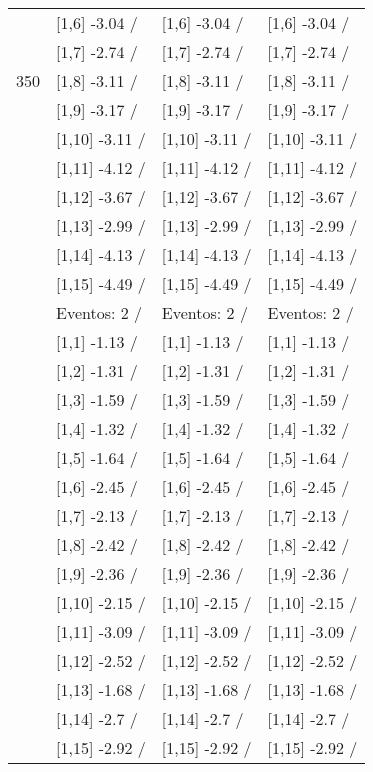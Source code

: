 \begin{table}
\begin{tabular}[t]{llll}
 & {}[1,6] -3.04  / & {}[1,6] -3.04  / & {}[1,6] -3.04  /\\
 & {}[1,7] -2.74  / & {}[1,7] -2.74  / & {}[1,7] -2.74  /\\
350 & {}[1,8] -3.11  / & {}[1,8] -3.11  / & {}[1,8] -3.11  /\\
\addlinespace
 & {}[1,9] -3.17  / & {}[1,9] -3.17  / & {}[1,9] -3.17  /\\
 & {}[1,10] -3.11  / & {}[1,10] -3.11  / & {}[1,10] -3.11  /\\
 & {}[1,11] -4.12  / & {}[1,11] -4.12  / & {}[1,11] -4.12  /\\
 & {}[1,12] -3.67  / & {}[1,12] -3.67  / & {}[1,12] -3.67  /\\
 & {}[1,13] -2.99  / & {}[1,13] -2.99  / & {}[1,13] -2.99  /\\
\addlinespace
 & {}[1,14] -4.13  / & {}[1,14] -4.13  / & {}[1,14] -4.13  /\\
 & {}[1,15] -4.49  / & {}[1,15] -4.49  / & {}[1,15] -4.49  /\\
 & Eventos:  2 / & Eventos:  2 / & Eventos:  2 /\\
 & {}[1,1] -1.13  / & {}[1,1] -1.13  / & {}[1,1] -1.13  /\\
 & {}[1,2] -1.31  / & {}[1,2] -1.31  / & {}[1,2] -1.31  /\\
\addlinespace
 & {}[1,3] -1.59  / & {}[1,3] -1.59  / & {}[1,3] -1.59  /\\
 & {}[1,4] -1.32  / & {}[1,4] -1.32  / & {}[1,4] -1.32  /\\
 & {}[1,5] -1.64  / & {}[1,5] -1.64  / & {}[1,5] -1.64  /\\
 & {}[1,6] -2.45  / & {}[1,6] -2.45  / & {}[1,6] -2.45  /\\
 & {}[1,7] -2.13  / & {}[1,7] -2.13  / & {}[1,7] -2.13  /\\
\addlinespace
500 & {}[1,8] -2.42  / & {}[1,8] -2.42  / & {}[1,8] -2.42  /\\
 & {}[1,9] -2.36  / & {}[1,9] -2.36  / & {}[1,9] -2.36  /\\
 & {}[1,10] -2.15  / & {}[1,10] -2.15  / & {}[1,10] -2.15  /\\
 & {}[1,11] -3.09  / & {}[1,11] -3.09  / & {}[1,11] -3.09  /\\
 & {}[1,12] -2.52  / & {}[1,12] -2.52  / & {}[1,12] -2.52  /\\
\addlinespace
 & {}[1,13] -1.68  / & {}[1,13] -1.68  / & {}[1,13] -1.68  /\\
 & {}[1,14] -2.7  / & {}[1,14] -2.7  / & {}[1,14] -2.7  /\\
 & {}[1,15] -2.92  / & {}[1,15] -2.92  / & {}[1,15] -2.92  /\\
\bottomrule
\end{tabular}
\end{table}
